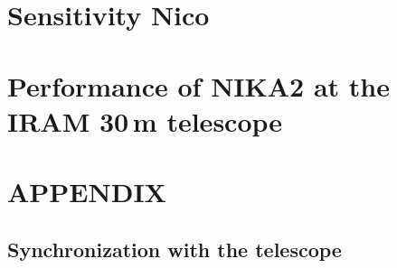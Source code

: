 \documentclass[a4paper, 11pt]{report}
\begin{document}
\clearpage
%


\clearpage
\chapter{Sensitivity {\color{YellowGreen} Nico}}
\label{se:nefd}
%

%
%



\clearpage
\chapter{Performance of NIKA2 at the IRAM 30\,m telescope}
\label{se:summary}



\clearpage
\appendix

\chapter{APPENDIX}

  \section{Synchronization with the telescope}
  \label{ap:synchro}
  
  
\end{document}
